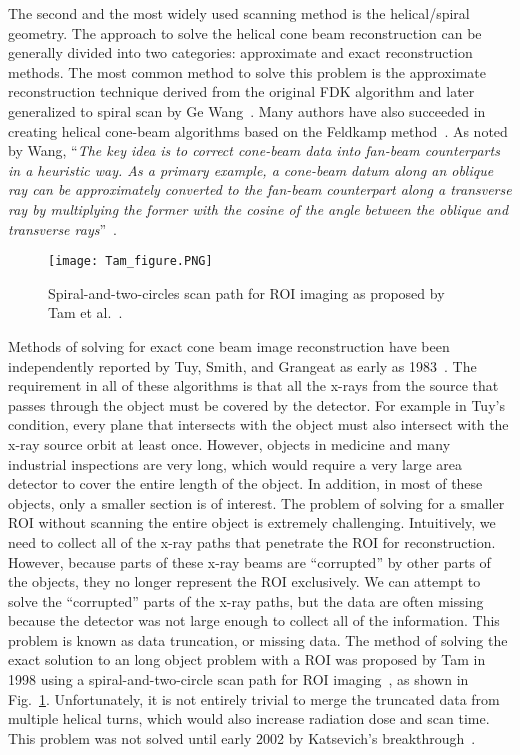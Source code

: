 The second and the most widely used scanning method is the helical/spiral geometry.  The approach to solve the helical cone beam reconstruction can be generally divided into two categories: approximate and exact reconstruction methods.  The most common method to solve this problem is the approximate reconstruction technique derived from the original FDK algorithm and later generalized to spiral scan by Ge Wang~\citep{Wang1993}.  Many authors have also succeeded in creating helical cone-beam algorithms based on the Feldkamp method~\citep{Wang1992, Kudo1991, Yan1992, Smith1992, Noo1999, Kachelriess2000, Tang2004, Tang2006a, Tang2006b}.  As noted by Wang, ``\textit{The key idea is to correct cone-beam data into fan-beam counterparts in a heuristic way.  As a primary example, a cone-beam datum along an oblique ray can be approximately converted to the fan-beam counterpart along a transverse ray by multiplying the former with the cosine of the angle between the oblique and transverse rays}''~\citep{Wang2007}.
%
\begin{figure}[h]
\texttt{[image: Tam\_figure.PNG]}
\caption{Spiral-and-two-circles scan path for ROI imaging as proposed by Tam et al.~\citep{Tam1998}.}
\label{fig:tam_circle}
\end{figure}
%
Methods of solving for exact cone beam image reconstruction have been independently reported by Tuy, Smith, and Grangeat as early as 1983~\citep{Tuy1983, Smith1985, Grangeat1991}.  The requirement in all of these algorithms is that all the x-rays from the source that passes through the object must be covered by the detector.  For example in Tuy's condition, every plane that intersects with the object must also intersect with the x-ray source orbit at least once.  However, objects in medicine and many industrial inspections are very long, which would require a very large area detector to cover the entire length of the object.  In addition, in most of these objects, only a smaller section is of interest.  The problem of solving for a smaller ROI without scanning the entire object is extremely challenging.  Intuitively, we need to collect all of the x-ray paths that penetrate the ROI for reconstruction.  However, because parts of these x-ray beams are ``corrupted'' by other parts of the objects, they no longer represent the ROI exclusively.  We can attempt to solve the ``corrupted'' parts of the x-ray paths, but the data are often missing because the detector was not large enough to collect all of the information.  This problem is known as data truncation, or missing data.  The method of solving the exact solution to an long object problem with a ROI was proposed by Tam in 1998 using a spiral-and-two-circle scan path for ROI imaging~\citep{Tam1998}, as shown in Fig.~\ref{fig:tam_circle}.  Unfortunately, it is not entirely trivial to merge the truncated data from multiple helical turns,  which would also increase radiation dose and scan time.  This problem was not solved until early 2002 by Katsevich's breakthrough~\citep{Katsevich2002SIAM, Katsevich2003, Katsevich2004}.
